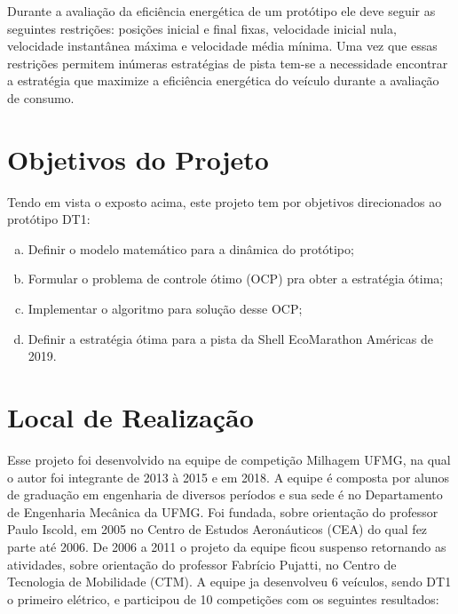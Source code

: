 Durante a avaliação da eficiência energética de um protótipo ele deve seguir as seguintes
restrições: posições inicial e final fixas, velocidade inicial nula, velocidade instantânea
máxima e velocidade média mínima. Uma vez que essas restrições permitem inúmeras
estratégias de pista tem-se a necessidade encontrar a estratégia que maximize a
eficiência energética do veículo durante a avaliação de consumo.


\section{Objetivos do Projeto}
\label{sec:objetivos}

Tendo em vista o exposto acima, este projeto tem por objetivos direcionados ao protótipo DT1:

\begin{enumerate}[(a)]
    \item Definir o modelo matemático para a dinâmica do protótipo;
    \item Formular o problema de controle ótimo (OCP) pra obter a estratégia ótima;
    \item Implementar o algoritmo para solução desse OCP;
    \item Definir a estratégia ótima para a pista da Shell EcoMarathon Américas de 2019.
\end{enumerate}

\section{Local de Realização}
\label{sec:empresa}


Esse projeto foi desenvolvido na equipe de competição Milhagem UFMG, na qual o autor foi integrante de 2013 à 2015 e em 2018. A equipe é composta por alunos de graduação em engenharia de diversos períodos e sua sede é no Departamento de Engenharia Mecânica da UFMG.
Foi fundada, sobre orientação do
professor Paulo Iscold, em 2005 no Centro de Estudos Aeronáuticos (CEA) do qual fez
parte até 2006.
De 2006 a 2011 o projeto da equipe ficou suspenso retornando as atividades, sobre orientação do professor Fabrício Pujatti, no Centro de Tecnologia
de Mobilidade (CTM). A equipe ja desenvolveu 6 veículos, sendo DT1 o primeiro elétrico, e participou de 10 competições com os seguintes resultados:


